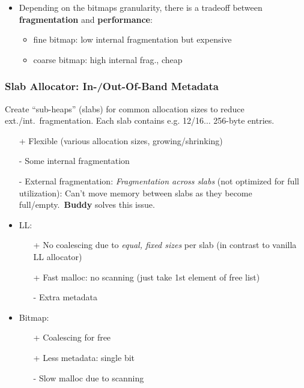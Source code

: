 \begin{itemize}
    \item Depending on the bitmaps granularity, there is a tradeoff between \textbf{fragmentation} and \textbf{performance}:%
          \begin{itemize}
              \item fine bitmap: low internal fragmentation but expensive  %
              \item coarse bitmap: high internal frag., cheap  %
          \end{itemize}
\end{itemize}


\subsubsection{Slab Allocator: In-/Out-Of-Band Metadata}
Create ``sub-heaps'' (slabs) for common allocation sizes to reduce ext./int.\ fragmentation. Each slab contains e.g. 12/16$\dots$ 256-byte entries.

\begin{itemize}
    \item[+] Flexible (various allocation sizes, growing/shrinking)
    \item[-] Some internal fragmentation
    \item[-] External fragmentation: \textit{Fragmentation across slabs} (not optimized for full utilization): Can't move memory between slabs as they become full/empty.\ \textbf{Buddy} solves this issue.
\end{itemize}

\newpar{}
\begin{itemize}
    \item LL:
          \begin{itemize}
              \item [+] No coalescing due to \textit{equal, fixed sizes} per slab (in contrast to vanilla LL allocator)
              \item [+] Fast malloc: no scanning (just take 1st element of free list)
              \item [-] Extra metadata
          \end{itemize}
    \item Bitmap:
          \begin{itemize}
              \item [+] Coalescing for free
              \item [+] Less metadata: single bit
              \item [-] Slow malloc due to scanning
          \end{itemize}
\end{itemize}

